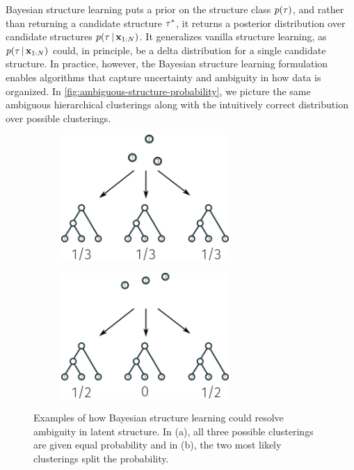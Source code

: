 Bayesian structure learning puts a prior on the structure class $p(\tau)$, and rather than
returning a candidate structure $\tau^*$,
it returns a posterior distribution over candidate
structures $p(\tau \,|\, \mathbf{x}_{1:N})$. It generalizes 
vanilla structure learning, as $p(\tau \,|\, \mathbf{x}_{1:N})$ could,
in principle,
be a delta distribution for a single candidate structure.
In practice, however, the Bayesian structure learning
formulation enables algorithms that capture
uncertainty and ambiguity in how data is organized.
In \autoref{fig:ambiguous-structure-probability},
we picture the same ambiguous hierarchical clusterings
along with the intuitively correct distribution over possible clusterings. 

\begin{figure}[htp!]
    \centering
    \begin{subfigure}{\textwidth}
        \centering
        \includegraphics[width=0.7\textwidth]{img/structure/3-cluster-distribution}
        \caption{}
    \end{subfigure}
    \begin{subfigure}{\textwidth}
        \centering
        \includegraphics[width=0.7\textwidth]{img/structure/3-cluster-linear-distribution}
        \caption{}
    \end{subfigure}
    \caption{Examples of how Bayesian structure learning could resolve ambiguity in latent structure. In (a), all three possible clusterings are given equal probability and in (b), the two most likely clusterings split the probability.}
    \label{fig:ambiguous-structure-probability}
\end{figure}

